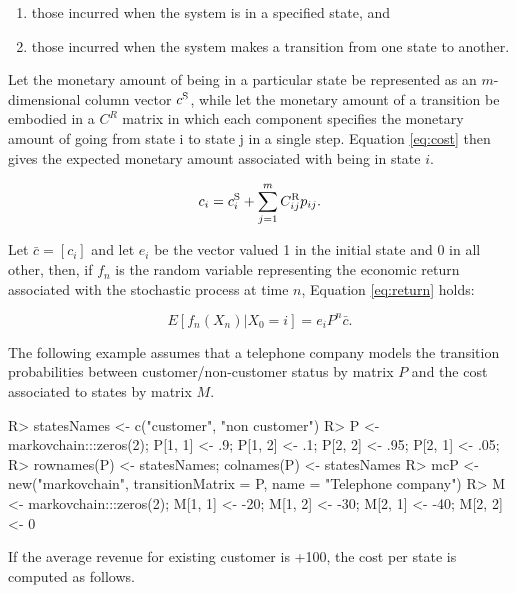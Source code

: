\documentclass[
  nojss]{jss}
\providecommand{\tightlist}{%
  \setlength{\itemsep}{0pt}\setlength{\parskip}{0pt}}
\begin{document}
\begin{enumerate}
\def\labelenumi{\arabic{enumi}.}
\tightlist
\item
  those incurred when the system is in a specified state, and
\item
  those incurred when the system makes a transition from one state to another.
\end{enumerate}

Let the monetary amount of being in a particular state be represented as an \(m\)-dimensional column vector \(c^{\rm{S}}\), while let the monetary amount of a transition be embodied in a \(C^{R}\) matrix in which each component specifies the monetary amount of going from state i to state j in a single step. Equation \eqref{eq:cost} then gives the expected monetary amount associated with being in state \(i\).

\begin{equation}
{c_i} = c_i^{\rm{S}} + \sum\limits_{j = 1}^m {C_{ij}^{\rm{R}}} {p_{ij}}.
\label{eq:cost}
\end{equation}

Let \(\bar c = \left[ c_i \right]\) and let \(e_i\) be the vector valued 1 in the initial state and 0 in all other, then, if \(f_n\) is the random variable representing the economic return associated with the stochastic process at time \(n\), Equation \eqref{eq:return} holds:

\begin{equation}
E\left[ {{f_n}\left( {{X_n}} \right)|{X_0} = i} \right] = {e_i}{P^n}\bar c.
\label{eq:return}
\end{equation}

The following example assumes that a telephone company models the transition probabilities between customer/non-customer status by matrix \(P\) and the cost associated to states by matrix \(M\).

\begin{CodeChunk}
\begin{CodeInput}
R> statesNames <- c("customer", "non customer")
R> P <- markovchain:::zeros(2); P[1, 1] <- .9; P[1, 2] <- .1; P[2, 2] <- .95; P[2, 1] <- .05;
R> rownames(P) <- statesNames; colnames(P) <- statesNames
R> mcP <- new("markovchain", transitionMatrix = P, name = "Telephone company")
R> M <- markovchain:::zeros(2); M[1, 1] <- -20; M[1, 2] <- -30; M[2, 1] <- -40; M[2, 2] <- 0
\end{CodeInput}
\end{CodeChunk}

If the average revenue for existing customer is +100, the cost per state is computed as follows.
\end{document}
